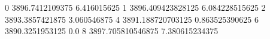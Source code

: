 0 3896.7412109375 6.416015625
1 3896.409423828125 6.084228515625
2 3893.3857421875 3.060546875
4 3891.188720703125 0.863525390625
6 3890.3251953125 0.0
8 3897.705810546875 7.380615234375
